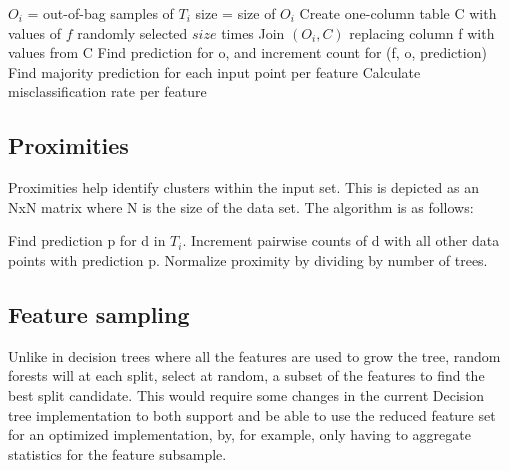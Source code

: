  \begin{algorithm}[calculateVariableImportance$(R, F^*)$] \label{alg:variableImportance}
   \begin{algorithmic}[1]
     \State $O_i$ = out-of-bag samples of $T_i$
     \State size = size of $O_i$
       \State Create one-column table C with values of $f$ randomly selected $size$ times
       \State Join $(O_i,C)$ replacing column f with values from C
         \State Find prediction for o, and increment count for (f, o, prediction)
       \EndFor
     \EndFor
   \EndFor
   \State Find majority prediction for each input point per feature
   \State Calculate misclassification rate per feature
  \end{algorithmic}
 \end{algorithm}

\subsection{Proximities}
Proximities help identify clusters within the input set. This is depicted
as an NxN matrix where N is the size of the data set.
The algorithm is as follows:

 \begin{algorithm}[calculateProximity$(R, D^*)$] \label{alg:proximity}
   \begin{algorithmic}[1]
       \State Find prediction p for d in $T_i$. Increment pair\-wise counts of d with all other data points with prediction p. 
     \EndFor
   \EndFor
   \State Normalize proximity by dividing by number of trees.
  \end{algorithmic}
 \end{algorithm}

\subsection{Feature sampling}
Unlike in decision trees where all the features are used to grow the tree, 
random forests will at each split, select at random, a subset of the 
features to find the best split candidate. This would require some changes
in the current Decision tree implementation to both support and be able to
use the reduced feature set for an optimized implementation, by, for example,
only having to aggregate statistics for the feature subsample. 
 
